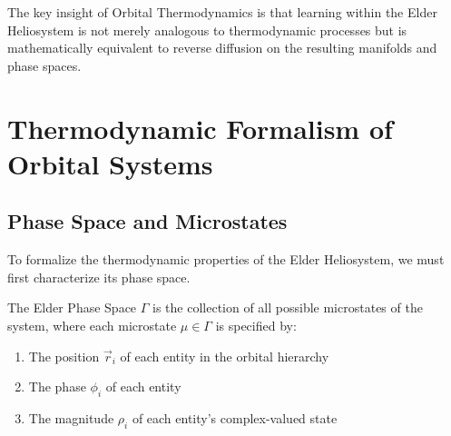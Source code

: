 The key insight of Orbital Thermodynamics is that learning within the Elder Heliosystem is not merely analogous to thermodynamic processes but is mathematically equivalent to reverse diffusion on the resulting manifolds and phase spaces.

\section{Thermodynamic Formalism of Orbital Systems}

\subsection{Phase Space and Microstates}

To formalize the thermodynamic properties of the Elder Heliosystem, we must first characterize its phase space.

\begin{definition}
The Elder Phase Space $\Gamma$ is the collection of all possible microstates of the system, where each microstate $\mu \in \Gamma$ is specified by:
\begin{enumerate}
    \item The position $\vec{r}_i$ of each entity in the orbital hierarchy
    \item The phase $\phi_i$ of each entity
    \item The magnitude $\rho_i$ of each entity's complex-valued state
\end{enumerate}
\end{definition}

